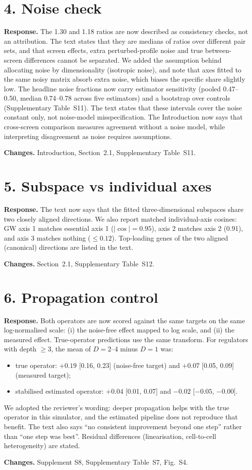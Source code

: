 \documentclass[10pt]{article}
\newcommand{\resp}{\par\smallskip\noindent\textbf{Response.} }
\newcommand{\chg}{\par\smallskip\noindent\textbf{Changes.} }
\begin{document}
\section*{4. Noise check}
\resp The 1.30 and 1.18 ratios are now described as consistency checks, not an attribution. The text states that they are medians of ratios over different pair sets, and that screen effects, extra perturbed-profile noise and true between-screen differences cannot be separated.
We added the assumption behind allocating noise by dimensionality (isotropic noise), and note that axes fitted to the same noisy matrix absorb extra noise, which biases the specific share slightly low.
The headline noise fractions now carry estimator sensitivity (pooled 0.47--0.50, median 0.74--0.78 across five estimators) and a bootstrap over controls (Supplementary Table~S11). The text states that these intervals cover the noise constant only, not noise-model misspecification.
The Introduction now says that cross-screen comparison measures agreement without a noise model, while interpreting disagreement as noise requires assumptions.
\chg Introduction, Section~2.1, Supplementary Table~S11.

\section*{5. Subspace vs individual axes}
\resp The text now says that the fitted three-dimensional subspaces share two closely aligned directions. We also report matched individual-axis cosines: GW axis 1 matches essential axis 1 ($|\cos|=0.95$), axis 2 matches axis 2 (0.91), and axis 3 matches nothing ($\le0.12$). Top-loading genes of the two aligned (canonical) directions are listed in the text.
\chg Section~2.1, Supplementary Table~S12.

\section*{6. Propagation control}
\resp Both operators are now scored against the same targets on the same log-normalised scale: (i) the noise-free effect mapped to log scale, and (ii) the measured effect. True-operator predictions use the same transform.
For regulators with depth $\ge3$, the mean of $D=2$--4 minus $D=1$ was:
\begin{itemize}
\item true operator: $+0.19$ [0.16, 0.23] (noise-free target) and $+0.07$ [0.05, 0.09] (measured target);
\item stabilised estimated operator: $+0.04$ [0.01, 0.07] and $-0.02$ [$-0.05$, $-0.00$].
\end{itemize}
We adopted the reviewer's wording: deeper propagation helps with the true operator in this simulator, and the estimated pipeline does not reproduce that benefit. The text also says ``no consistent improvement beyond one step'' rather than ``one step was best''. Residual differences (linearisation, cell-to-cell heterogeneity) are stated.
\chg Supplement S8, Supplementary Table~S7, Fig.~S4.
\end{document}
